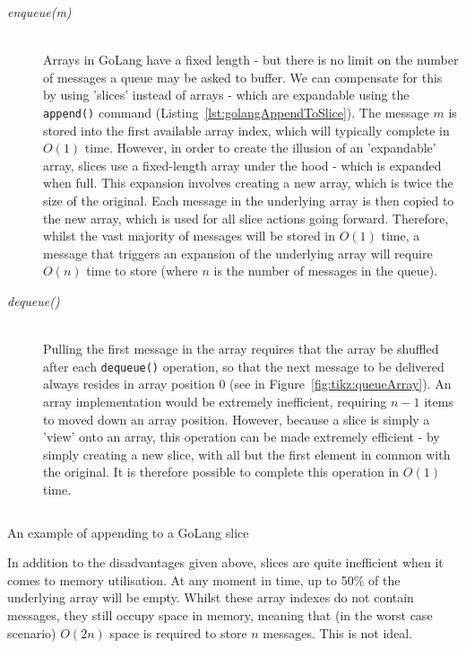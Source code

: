 \begin{description}
  \item[\textit{enqueue(m)}] \hfill \\
    Arrays in GoLang have a fixed length - but there is no limit on the number
    of messages a queue may be asked to buffer. We can compensate for this by
    using 'slices' instead of arrays -
    which are expandable using the \texttt{append()} command
    (Listing~\ref{lst:golangAppendToSlice}). The message $m$ is stored into the
    first available array index, which will typically complete in $O(1)$ time.
    However, in order to create the illusion of an 'expandable' array, slices
    use a fixed-length array under the hood - which is expanded when full. This
    expansion involves creating a new array, which is twice the size of the
    original. Each message in the underlying array is then copied to the new
    array, which is used for all slice actions going forward. Therefore, whilst
    the vast majority of messages will be stored in $O(1)$ time, a message that
    triggers an expansion of the underlying array will require $O(n)$ time to
    store (where $n$ is the number of messages in the queue).
  \item[\textit{dequeue()}] \hfill \\
    Pulling the first message in the array requires that the array be shuffled
    after each \texttt{dequeue()} operation, so that the next message to
    be delivered always resides in  array position 0 (see in
    Figure~\ref{fig:tikz:queueArray}). An array implementation would be
    extremely inefficient, requiring $n - 1$ items to moved down an array
    position. However, because a slice is simply a 'view' onto an array, this
    operation can be made extremely efficient - by simply creating a new slice,
    with all but the first element in common with the original.
    It is therefore possible to complete this operation in $O(1)$ time.
\end{description}

\begin{listing}[H]
  \centering
  \inputminted[firstline=7, lastline=12]{go}{code/snippets/appendToSlice.go}
  \caption{An example of appending to a GoLang slice}
  \label{lst:golangAppendToSlice}
\end{listing}

In addition to the disadvantages given above, slices are quite inefficient when
it comes to memory utilisation. At any moment in time, up to 50\% of the
underlying array will be empty. Whilst these array indexes do not contain
messages, they still occupy space in memory, meaning that (in the worst case
scenario) $O(2n)$ space is required to store $n$ messages. This is not ideal.

